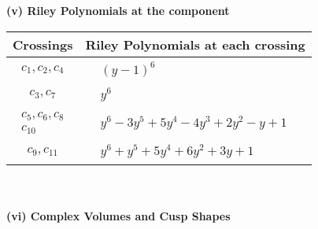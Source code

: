 \documentclass[1p]{elsarticle_modified}
\theoremstyle{definition}
\begin{document}
\newpage\renewcommand{\arraystretch}{1}
\flushleft \textbf{(v) Riley Polynomials at the component}\newline \\
\begin{tabular}{m{50pt}|m{274pt}}
Crossings & \hspace{64pt}Riley Polynomials at each crossing \\
\hline $$\begin{aligned}c_{1},c_{2},c_{4}\end{aligned}$$&$\begin{aligned}
&(y-1)^6
\end{aligned}$\\
\hline $$\begin{aligned}c_{3},c_{7}\end{aligned}$$&$\begin{aligned}
&y^6
\end{aligned}$\\
\hline $$\begin{aligned}c_{5},c_{6},c_{8}\\c_{10}\end{aligned}$$&$\begin{aligned}
&y^6-3 y^5+5 y^4-4 y^3+2 y^2- y+1
\end{aligned}$\\
\hline $$\begin{aligned}c_{9},c_{11}\end{aligned}$$&$\begin{aligned}
&y^6+y^5+5 y^4+6 y^2+3 y+1
\end{aligned}$\\
\hline
\end{tabular}\\~\\
\newpage\flushleft \textbf{(vi) Complex Volumes and Cusp Shapes}
\end{document}
